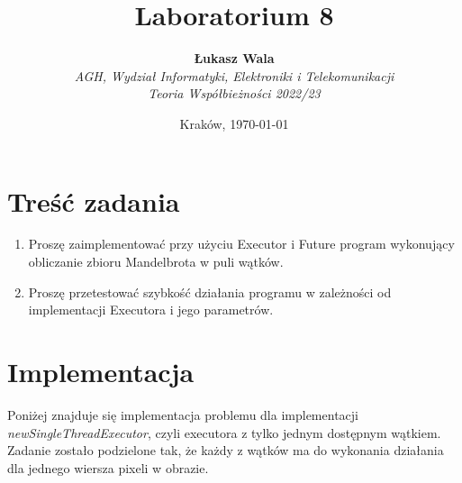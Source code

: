 \documentclass{article}
\title{Laboratorium 8}
\author{\textbf{Łukasz Wala}\\
    \textit{AGH, Wydział Informatyki, Elektroniki i Telekomunikacji} \\
    \textit{Teoria Współbieżności 2022/23}}
\date{Kraków, \today}
\begin{document}
\maketitle

\section{Treść zadania}
\begin{enumerate}
    \item 
    Proszę zaimplementować przy użyciu Executor i Future program wykonujący obliczanie zbioru Mandelbrota w puli wątków.
    \item
    Proszę przetestować szybkość działania programu w zależności od implementacji Executora i jego parametrów.
\end{enumerate}

\section{Implementacja}

Poniżej znajduje się implementacja problemu dla implementacji \textit{newSingleThreadExecutor},
czyli executora z tylko jednym dostępnym wątkiem. Zadanie zostało podzielone tak, że każdy z wątków
ma do wykonania działania dla jednego wiersza pixeli w obrazie.
\end{document}
